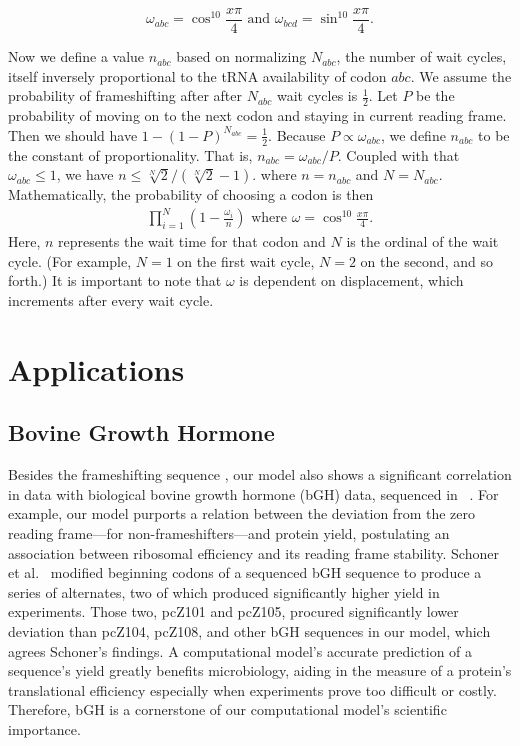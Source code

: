 \documentclass[12pt, draft]{article}
\numberwithin{equation}{section}
\begin{document}
\begin{equation}
  \omega_{abc} = \cos^{10}{\frac{x\pi}{4}} \text{ and } \omega_{bcd} = \sin^{10}{\frac{x\pi}{4}}.
\end{equation}

Now we define a value $n_{abc}$ based on normalizing $N_{abc}$, the
number of wait cycles, itself inversely proportional to the
tRNA availability of codon $abc$.
We assume the probability of frameshifting after
after $N_{abc}$ wait cycles is $\frac{1}{2}$.  Let $P$ be the
probability of moving on to the next codon and staying in current reading
frame.  Then we should have $1-\left(1-P\right)^{N_{abc}} =
\frac{1}{2}$.  Because $P \propto \omega_{abc}$, we define $n_{abc}$ to be the constant of
proportionality. That is, $n_{abc} = \omega_{abc} / P$.  Coupled
with that $\omega_{abc} \le 1$, we have $n \le \sqrt[N]{2}/(\sqrt[N]{2} - 1).$
where $n = n_{abc}$ and $N = N_{abc}$. Mathematically, the probability of choosing a codon is then
\begin{align}
  \prod_{i=1}^N \left(1-\frac{\omega_i}{n}\right) \text{ where } \omega = \cos^{10}{\frac{x\pi}{4}}.
\end{align}
Here, $n$ represents the wait time for that codon and $N$ is the ordinal of the wait cycle. (For example,
$N=1$ on the first wait cycle, $N=2$ on the second, and so forth.)
It is important to note that $\omega$ is dependent on displacement, 
which increments after every wait cycle.

\section{Applications}

\subsection{Bovine Growth Hormone}
Besides the frameshifting sequence \prfB, our model also shows a significant correlation in data with biological
bovine growth hormone (bGH) data, sequenced in \ecoli~\cite{schoner:bgh}. For example, our model purports a relation
between the deviation from the zero reading frame---for non-frameshifters---and protein yield, postulating
an association between ribosomal efficiency and its reading frame stability. Schoner et al.~\cite{schoner:bgh}
modified beginning codons of a sequenced bGH sequence to produce a series of alternates,
two of which produced significantly higher yield in experiments. Those two, pcZ101 and pcZ105, procured significantly
lower deviation than pcZ104, pcZ108, and other bGH sequences in our model, which agrees Schoner's findings.
A computational model's accurate prediction of a sequence's yield greatly benefits microbiology,
aiding in the measure of a protein's translational efficiency especially when experiments prove too difficult
or costly. Therefore, bGH is a cornerstone of our computational model's scientific importance.
\end{document}
